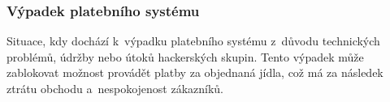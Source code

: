         \subsubsection{Výpadek platebního systému} 
        Situace, kdy dochází k~výpadku platebního systému z~důvodu technických problémů, údržby nebo útoků hackerských skupin. Tento výpadek může zablokovat možnost provádět platby za objednaná jídla, což má za následek ztrátu obchodu a~nespokojenost zákazníků.


    
\pagebreak
